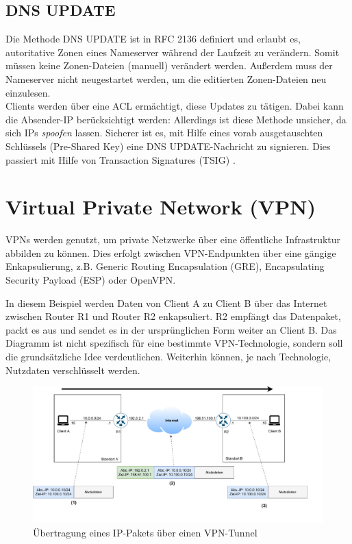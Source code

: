 \subsection{DNS UPDATE}
Die Methode DNS UPDATE ist in RFC 2136 definiert und erlaubt es, autoritative Zonen eines Nameserver während der Laufzeit zu verändern. Somit müssen keine Zonen-Dateien (manuell) verändert werden. Außerdem muss der Nameserver nicht neugestartet werden, um die editierten Zonen-Dateien neu einzulesen.\\
Clients werden über eine ACL ermächtigt, diese Updates zu tätigen. Dabei kann die Absender-IP berücksichtigt werden: Allerdings ist diese Methode unsicher, da sich IPs \textit{spoofen} lassen. Sicherer ist es, mit Hilfe eines vorab ausgetauschten Schlüssels (Pre-Shared Key) eine DNS UPDATE-Nachricht zu signieren. Dies passiert mit Hilfe von Transaction Signatures (TSIG) \cite[S.911-914]{Fall2011}.

\section{Virtual Private Network (VPN)}\label{vpn}
VPNs werden genutzt, um private Netzwerke über eine öffentliche Infrastruktur abbilden zu können. Dies erfolgt zwischen VPN-Endpunkten über eine gängige Enkapsulierung, z.B. Generic Routing Encapsulation (GRE), Encapsulating Security Payload (ESP) oder OpenVPN.

In diesem Beispiel werden Daten von Client A zu Client B über das Internet zwischen Router R1 und Router R2 enkapsuliert. R2 empfängt das Datenpaket, packt es aus und sendet es in der ursprünglichen Form weiter an Client B. Das Diagramm ist nicht spezifisch für eine bestimmte VPN-Technologie, sondern soll die grundsätzliche Idee verdeutlichen. Weiterhin können, je nach Technologie, Nutzdaten verschlüsselt werden. 

\begin{figure}[h]
  \centering
  \includegraphics{Figures/vpn-example.pdf}
  \caption{Übertragung eines IP-Pakets über einen VPN-Tunnel}
  \label{grafik: vpn-example}
\end{figure}\FloatBarrier

